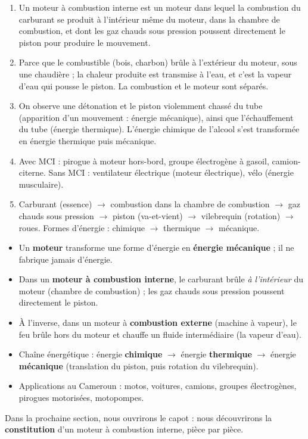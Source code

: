 \documentclass[11pt]{article}
\begin{document}
\begin{corrige}
\begin{enumerate}
\item Un moteur à combustion interne est un moteur dans lequel la combustion du carburant se produit à l'intérieur même du moteur, dans la chambre de combustion, et dont les gaz chauds sous pression poussent directement le piston pour produire le mouvement.
\item Parce que le combustible (bois, charbon) brûle à l'extérieur du moteur, sous une chaudière ; la chaleur produite est transmise à l'eau, et c'est la vapeur d'eau qui pousse le piston. La combustion et le moteur sont séparés.
\item On observe une détonation et le piston violemment chassé du tube (apparition d'un mouvement : énergie mécanique), ainsi que l'échauffement du tube (énergie thermique). L'énergie chimique de l'alcool s'est transformée en énergie thermique puis mécanique.
\item Avec MCI : pirogue à moteur hors-bord, groupe électrogène à gasoil, camion-citerne. Sans MCI : ventilateur électrique (moteur électrique), vélo (énergie musculaire).
\item Carburant (essence) $\rightarrow$ combustion dans la chambre de combustion $\rightarrow$ gaz chauds sous pression $\rightarrow$ piston (va-et-vient) $\rightarrow$ vilebrequin (rotation) $\rightarrow$ roues. Formes d'énergie : chimique $\rightarrow$ thermique $\rightarrow$ mécanique.
\end{enumerate}
\end{corrige}

\begin{aretenir}
\begin{itemize}
\item Un \textbf{moteur} transforme une forme d'énergie en \textbf{énergie mécanique} ; il ne fabrique jamais d'énergie.
\item Dans un \textbf{moteur à combustion interne}, le carburant brûle \emph{à l'intérieur} du moteur (chambre de combustion) ; les gaz chauds sous pression poussent directement le piston.
\item À l'inverse, dans un moteur à \textbf{combustion externe} (machine à vapeur), le feu brûle hors du moteur et chauffe un fluide intermédiaire (la vapeur d'eau).
\item Chaîne énergétique : énergie \textbf{chimique} $\rightarrow$ énergie \textbf{thermique} $\rightarrow$ énergie \textbf{mécanique} (translation du piston, puis rotation du vilebrequin).
\item Applications au Cameroun : motos, voitures, camions, groupes électrogènes, pirogues motorisées, motopompes.
\end{itemize}
Dans la prochaine section, nous ouvrirons le capot : nous découvrirons la \textbf{constitution} d'un moteur à combustion interne, pièce par pièce.
\end{aretenir}
\end{document}
